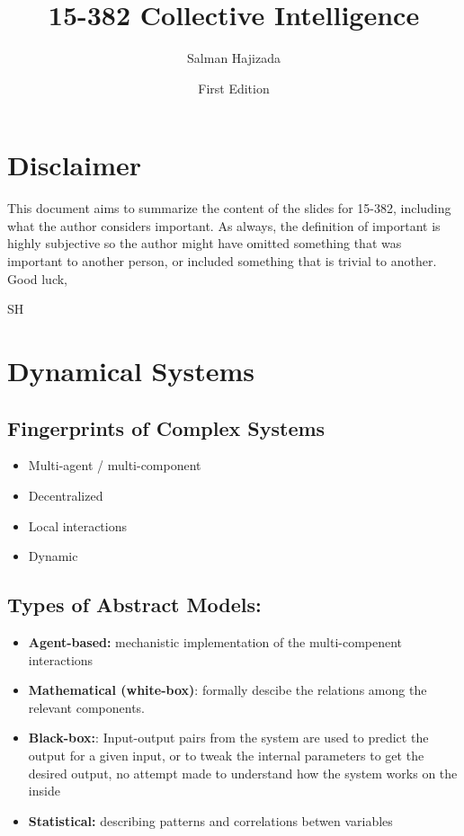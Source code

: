 \documentclass{report}
\title{15-382 Collective Intelligence}
\date{First Edition}
\author{Salman Hajizada}
\begin{document}
\maketitle

\setcounter{chapter}{-1}
\chapter*{Disclaimer}
This document aims to summarize the content of the slides for 15-382, including
what the author considers important. As always, the definition of important is
highly subjective so the author might have omitted something that was
important to another person, or included something that is trivial to another.\\

Good luck,

SH

\chapter*{Dynamical Systems}

\section*{Fingerprints of Complex Systems}

\begin{itemize}
    \item Multi-agent / multi-component
    \item Decentralized
    \item Local interactions
    \item Dynamic
\end{itemize}

\section*{Types of Abstract Models:}

\begin{itemize}
    \item \textbf{Agent-based:} mechanistic implementation of the multi-compenent interactions
    \item \textbf{Mathematical (white-box)}: formally descibe the relations among the relevant components.
    \item \textbf{Black-box:}: Input-output pairs from the system are used to predict the output for a given input, or to tweak the internal parameters to get the desired output, no attempt made to understand how the system works on the inside
    \item \textbf{Statistical:} describing patterns and correlations betwen variables
\end{itemize}
\end{document}
